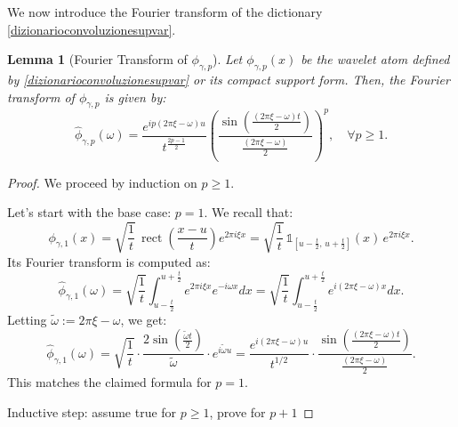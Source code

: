 \documentclass[preprint,hidelinks,authoryear]{elsarticle}
\newtheorem{Lemma}[Thm]{Lemma}
\theoremstyle{plain}
\theoremstyle{definition}
\theoremstyle{remark}
\begin{document}
We now introduce the Fourier transform of the dictionary \eqref{dizionarioconvoluzionesupvar}.






\begin{Lemma}[Fourier Transform of $ \phi_{\gamma,p} $]
    Let $ \phi_{\gamma,p}(x) $ be the wavelet atom defined by \eqref{dizionarioconvoluzionesupvar} or its compact support form. Then, the Fourier transform of $ \phi_{\gamma,p} $ is given by:
$$
\hat{\phi}_{\gamma,p}(\omega) = \frac{e^{i p (2\pi \xi - \omega) u}}{t^{\frac{2p - 1}{2}}} \left( \frac{\sin\left( \frac{(2\pi \xi - \omega) t}{2} \right)}{ \frac{(2\pi \xi - \omega)}{2} } \right)^p, \quad \forall p \ge 1.
$$

\end{Lemma}
\begin{proof}
We proceed by induction on $ p \ge 1 $.

Let's start with the base case: $ p = 1 $. We recall that:
$$
\phi_{\gamma,1}(x) = \sqrt{\frac{1}{t}} \, \operatorname{rect}\left( \frac{x - u}{t} \right) e^{2\pi i \xi x} = \sqrt{\frac{1}{t}} \, \mathds{1}_{[u - \frac{t}{2}, \, u + \frac{t}{2}]}(x) \, e^{2\pi i \xi x}.
$$
Its Fourier transform is computed as:
$$
\hat{\phi}_{\gamma,1}(\omega) = \sqrt{\frac{1}{t}} \int_{u - \frac{t}{2}}^{u + \frac{t}{2}} e^{2\pi i \xi x} e^{-i \omega x} dx = \sqrt{\frac{1}{t}} \int_{u - \frac{t}{2}}^{u + \frac{t}{2}} e^{i(2\pi \xi - \omega)x} dx.
$$
Letting $ \tilde{\omega} := 2\pi \xi - \omega $, we get:
$$
\hat{\phi}_{\gamma,1}(\omega) = \sqrt{\frac{1}{t}} \cdot \frac{2 \sin\left( \frac{\tilde{\omega} t}{2} \right)}{\tilde{\omega}} \cdot e^{i \tilde{\omega} u} = \frac{e^{i(2\pi \xi - \omega) u}}{t^{1/2}} \cdot \frac{ \sin\left( \frac{(2\pi \xi - \omega)t}{2} \right) }{ \frac{(2\pi \xi - \omega)}{2} }.
$$
This matches the claimed formula for $ p = 1 $.


    
Inductive step: assume true for $ p \ge 1 $, prove for $ p+1 $


\end{proof}
\end{document}

